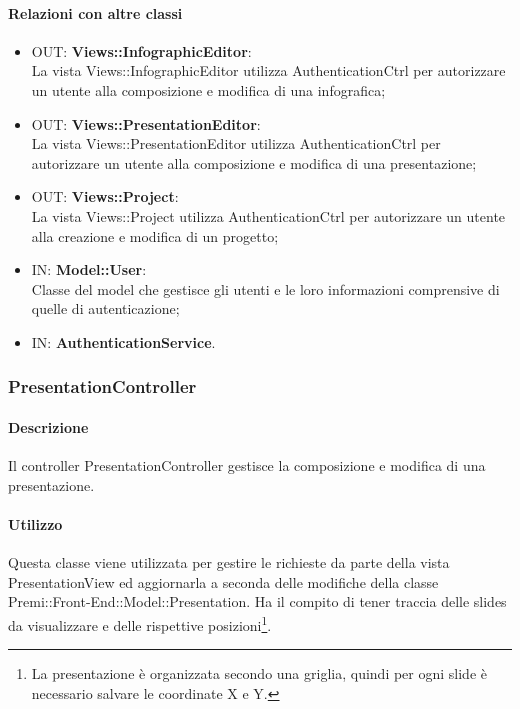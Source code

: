 	\paragraph{Relazioni con altre classi}
	\begin{itemize}
	  \item OUT: \textbf{Views::InfographicEditor}:\\
		La vista Views::InfographicEditor utilizza AuthenticationCtrl per autorizzare un utente alla composizione e modifica di una infografica;	
	  \item OUT: \textbf{Views::PresentationEditor}:\\
		La vista Views::PresentationEditor utilizza AuthenticationCtrl per autorizzare un utente alla composizione e modifica di una presentazione;	
	  \item OUT: \textbf{Views::Project}:\\
		La vista Views::Project utilizza AuthenticationCtrl per autorizzare un utente alla creazione e modifica di un progetto;	
	  \item IN: \textbf{Model::User}:\\
		Classe del model che gestisce gli utenti e le loro informazioni comprensive di quelle di autenticazione;
	   \item IN: \textbf{AuthenticationService}.
	\end{itemize}	
	

\subsubsection{PresentationController}
	\paragraph{Descrizione}
	Il controller PresentationController gestisce la composizione e modifica di una presentazione.
	
	\paragraph{Utilizzo}
	Questa classe viene utilizzata per gestire le richieste da parte della vista PresentationView ed aggiornarla a seconda delle modifiche della classe Premi::Front-End::Model::Presentation.
	Ha il compito di tener traccia delle slides da visualizzare e delle rispettive posizioni\footnote{La presentazione è organizzata secondo una griglia, quindi per ogni slide è necessario salvare le coordinate X e Y.}.
